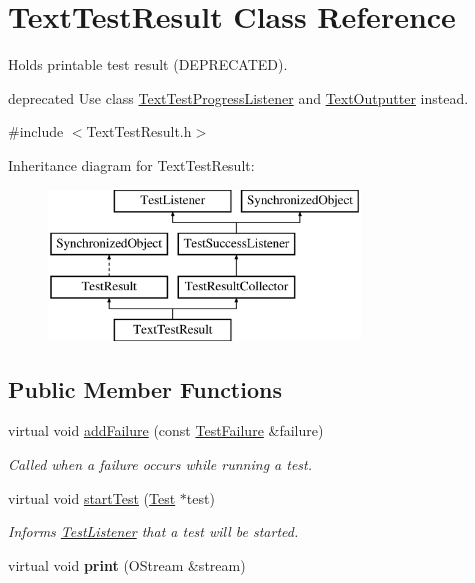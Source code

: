\hypertarget{class_text_test_result}{}\section{Text\+Test\+Result Class Reference}
\label{class_text_test_result}


Holds printable test result (D\+E\+P\+R\+E\+C\+A\+T\+ED).

deprecated Use class \hyperlink{class_text_test_progress_listener}{Text\+Test\+Progress\+Listener} and \hyperlink{class_text_outputter}{Text\+Outputter} instead.  




{\ttfamily \#include $<$Text\+Test\+Result.\+h$>$}

Inheritance diagram for Text\+Test\+Result\+:\begin{figure}[H]
\begin{center}
\leavevmode
\includegraphics[height=4.000000cm]{class_text_test_result}
\end{center}
\end{figure}
\subsection*{Public Member Functions}
\begin{DoxyCompactItemize}
\item 
virtual void \hyperlink{class_text_test_result_a05d3b0e8e51b3430092166bbc3d17708}{add\+Failure} (const \hyperlink{class_test_failure}{Test\+Failure} \&failure)
\begin{DoxyCompactList}\small\item\em Called when a failure occurs while running a test. \end{DoxyCompactList}\item 
virtual void \hyperlink{class_text_test_result_a2191f5e916fca83151fb657b31dcd30d}{start\+Test} (\hyperlink{class_test}{Test} $\ast$test)\hypertarget{class_text_test_result_a2191f5e916fca83151fb657b31dcd30d}{}\label{class_text_test_result_a2191f5e916fca83151fb657b31dcd30d}

\begin{DoxyCompactList}\small\item\em Informs \hyperlink{class_test_listener}{Test\+Listener} that a test will be started. \end{DoxyCompactList}\item 
virtual void {\bfseries print} (O\+Stream \&stream)\hypertarget{class_text_test_result_a35fdfec0767de9f4c4fa0e319dfedb3b}{}\label{class_text_test_result_a35fdfec0767de9f4c4fa0e319dfedb3b}

\end{DoxyCompactItemize}
